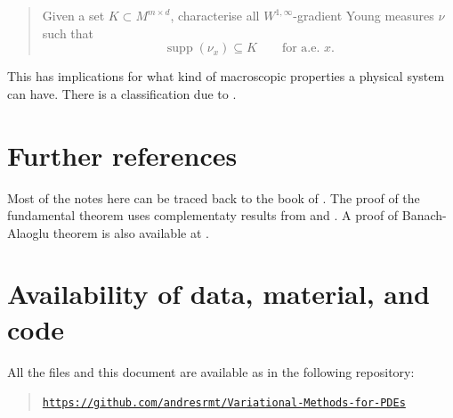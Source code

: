 \documentclass[a4paper,doc,11pt]{article}
\DeclareMathOperator{\supp}{supp}
\begin{document}
\begin{quote}
    Given a set \(K \subset M^{m\times d}\), characterise all \(W^{1,\infty}\)-gradient Young measures \(\nu\) such that
    \[
        \supp(\nu_x) \subseteq K
        \qquad \text{for a.e. } x.
    \]
\end{quote}

This has implications for what kind of macroscopic properties a physical system can have. There is a classification due to \citet{Kinderlehrer1994}.



\section*{Further references}

Most of the notes here can be traced back to the book of \citet{Mueller-1999}. The proof of the fundamental theorem uses complementaty results from \citet{Hungerbhler2011} and \citet{Balla-1989}. A proof of Banach-Alaoglu theorem is also available at \citet{Brezis2010}.






\section*{Availability of data, material, and code}
{

All the files and this document are available as in the following repository:
\begin{quote}
    \noindent \href{https://github.com/andresrmt/Variational-Methods-for-PDEs}{\texttt{https://github.com/andresrmt/Variational-Methods-for-PDEs}}
\end{quote}



}




\end{document}
